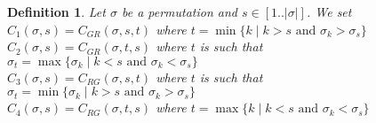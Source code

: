 \documentclass[11pt]{article}
\newtheorem{defn}[thm]{Definition}
\begin{document}
\begin{defn}\label{def:C_numero}
Let $\sigma$ be a permutation and $s \in [1..|\sigma|]$. We set \vspace{0.2 cm}\\
$C_1(\sigma, s) = C_{GR}(\sigma, s, t)$ where $t = \min \{k \mid k > s \text{ and } \sigma_k > \sigma_s\}$ \\
$C_2(\sigma, s) = C_{GR}(\sigma, t, s)$ where $t$ is such that $\sigma_t = \max \{\sigma_k \mid k < s \text{ and } \sigma_k < \sigma_s\}$\\
$C_3(\sigma, s) = C_{RG}(\sigma, s, t)$ where $t$ is such that $\sigma_t = \min \{\sigma_k \mid k > s \text{ and } \sigma_k > \sigma_s\}$\\
$C_4(\sigma, s) = C_{RG}(\sigma, t, s)$ where $t = \max \{k \mid k < s \text{ and } \sigma_k < \sigma_s\}$\\


\end{defn}
\end{document}

